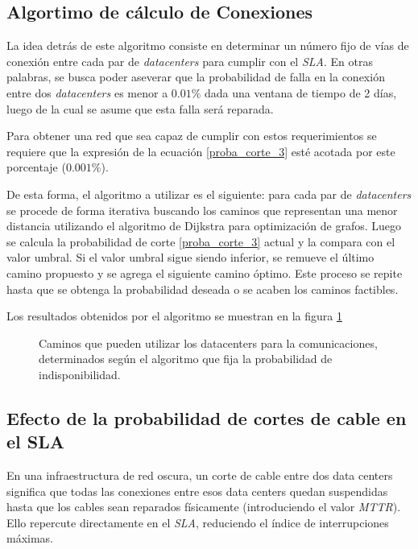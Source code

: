 \subsection{Algortimo de cálculo de Conexiones}
\label{sec:algoritmo_conex}

La idea detrás de este algoritmo consiste en determinar un número fijo 
de vías de conexión entre cada par de \emph{datacenters} para cumplir 
con el \emph{SLA}. En otras palabras, se busca poder aseverar que la 
probabilidad de falla en la conexión entre dos \emph{datacenters} es 
menor a $0.01 \%$ dada una ventana de tiempo de 2 días, luego de la cual
se asume que esta falla será reparada.

Para obtener una red que sea capaz de cumplir con estos requerimientos 
se requiere que la expresión de la ecuación \eqref{proba_corte_3} esté 
acotada por este porcentaje ($0.001\%$). 

De esta forma, el algoritmo a utilizar es el siguiente: para cada par 
de \emph{datacenters} se procede de forma iterativa buscando los caminos 
que representan una menor distancia utilizando el algoritmo de Dijkstra
para optimización de grafos. Luego se calcula la probabilidad de corte 
\eqref{proba_corte_3} actual y la compara con el valor umbral. Si el 
valor umbral sigue siendo inferior, se remueve el último camino propuesto 
y se agrega el siguiente camino óptimo. Este proceso se repite hasta que 
se obtenga la probabilidad deseada o se acaben los caminos factibles.

Los resultados obtenidos por el algoritmo se muestran en la figura
\ref{fig:caminos}

\begin{figure}[H]
  \centering
  \caption{Caminos que pueden utilizar los datacenters para la comunicaciones, determinados según el algoritmo que fija la probabilidad de indisponibilidad.}
  \label{fig:caminos}
\end{figure}


\subsection{Efecto de la probabilidad de cortes de cable en el SLA}
\label{sec:cortes}

En una infraestructura de red oscura, un corte de cable entre dos data
centers significa que todas las conexiones entre esos data centers
quedan suspendidas hasta que los cables sean reparados físicamente
(introduciendo el valor \emph{MTTR}). Ello repercute directamente
en el \emph{SLA}, reduciendo el índice de interrupciones máximas.

